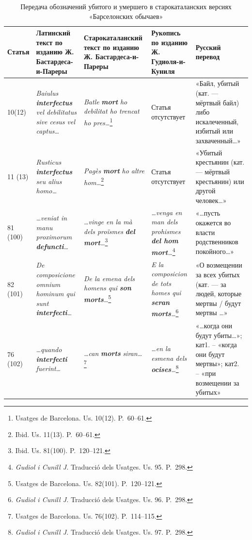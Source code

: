 \begin{center}
\small
\setlength{\tabcolsep}{2pt}
\begin{longtable}{|p{}|p{}|p{}|p{}|p{}|}
\caption{Передача обозначений убитого и умершего в старокаталанских версиях «Барселонских обычаев»}\label{tab:ch2-dead-killed}\\
\hline
\textbf{Статья} & \textbf{Латинский текст по изданию Ж. Бастардеса-и-Пареры} & \textbf{Старокаталанский текст по изданию Ж. Бастардеса-и-Пареры} & \textbf{Рукопись по изданию Ж. Гудиоля-и-Куниля} & \textbf{Русский перевод} \\ \hline
10(12) & \emph{Baiulus }\textbf{\emph{interfectus}}\emph{ vel debilitatus sive cesus vel captus…} & \emph{Batle }\textbf{\emph{mort }}\emph{ho debilitat ho trencat ho pres…}\footnote{Usatges de Barcelona. Us. 10(12). P.~60--61.} & Статья отсутствует & «Байл, убитый (кат. ---  мёртвый байл) либо искалеченный, избитый или захваченный…» \\ \hline
11 (13) & \emph{Rusticus }\textbf{\emph{interfectus}}\emph{ seu alius homo…} & \emph{Pagès }\textbf{\emph{mort}}\emph{ ho altre hom…}\footnote{Ibid. Us. 11(13). P.~60--61.} & Статья отсутствует & «Убитый крестьянин (кат. --- мёртвый крестьянин) или другой человек…» \\ \hline
81 (100) & \emph{…veniat in manu proximorum }\textbf{\emph{defuncti}}\emph{…} & \emph{…vinge en la mà dels proïsmes }\textbf{\emph{del mort}}\emph{…}\footnote{Ibid. Us. 81(100). P.~120--121.} & \emph{…venga en man dels prohismes }\textbf{\emph{del hom mort}}\emph{…}\footnote{\emph{Gudiol i Cunill J. }Traducció dels Usatges. Us. 95.\textbf{ }P.~298.} & «…пусть окажется во власти родственников покойного…» \\ \hline
82 (101) & \emph{De composicione omnium hominum qui sunt }\textbf{\emph{interfecti}}\emph{…} & \emph{De la emena dels homens qui }\textbf{\emph{son morts}}\emph{…}\footnote{Usatges de Barcelona. Us. 82(101). P.~120--121.} & \emph{E la composicion de tots homes qui }\textbf{\emph{seran morts}}\emph{…}\footnote{\emph{Gudiol i Cunill J. }Traducció dels Usatges. Us. 96.\textbf{ }P.~298.} & «О возмещении за всех убитых (кат. ---  за людей, которые мертвы / будут мертвы …» \\ \hline
76 (102) & \emph{…quando }\textbf{\emph{interfecti}}\emph{ fuerint…} & \emph{…can }\textbf{\emph{morts}}\emph{ siran…}\footnote{Usatges de Barcelona. Us. 76(102). P.~114--115.} & \emph{…en la esmena dels }\textbf{\emph{ocises}}\emph{…}\footnote{\emph{Gudiol i Cunill J. }Traducció dels Usatges. Us. 97.\textbf{ }P.~298.} & «…когда они будут убиты…»; кат1. -- «когда они будут мертвы»; кат2. -- «при возмещении за убитых» \\ \hline
\end{longtable}
\end{center}

